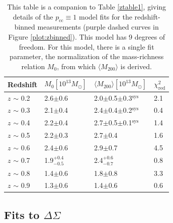 \begin{landscape}
\begin{table}
\centering
    \caption[Shear Results for Redshift-Binned Clusters (Perfectly Centered Model)]{This table is a companion to Table \ref{ztable1}, giving details of the $p_{\mathrm{cc}} \equiv 1$ model fits for the redshift-binned measurements (purple dashed curves in Figure \ref{plot:zbinned}). This model has 9 degrees of freedom. For this model, there is a single fit parameter, the normalization of the mass-richness relation $M_0$, from which $\langle M_{200} \rangle$ is derived.}
    \begin{tabular}{llll}
      \hline
      Redshift & $M_0 \left[ 10^{13} M_{\odot}\right]$ & $\langle M_{200} \rangle \left[ 10^{13} M_{\odot}\right]$ & $\chi^2_{\mathrm{red}}$ \\ \hline
      $z$ $\sim$ 0.2 & 2.6$\pm$0.6 & 2.0$\pm$0.5$\pm$0.3$^{\mathrm{sys}}$ & 2.1  \\
      $z$ $\sim$ 0.3 & 2.1$\pm$0.4 & 2.4$\pm$0.4$\pm$0.2$^{\mathrm{sys}}$ & 0.4  \\
      $z$ $\sim$ 0.4 & 2.2$\pm$0.4 & 2.7$\pm$0.5$\pm$0.1$^{\mathrm{sys}}$ & 1.4  \\
      $z$ $\sim$ 0.5 & 2.2$\pm$0.3 & 2.7$\pm$0.4 & 1.6  \\
      $z$ $\sim$ 0.6 & 2.4$\pm$0.6 & 2.9$\pm$0.7 & 4.5  \\
      $z$ $\sim$ 0.7 & 1.9$^{+0.4}_{-0.5}$ & 2.4$^{+0.6}_{-0.7}$ & 0.8  \\
      $z$ $\sim$ 0.8 & 1.4$\pm$0.6 & 1.8$\pm$0.8 & 3.3  \\ 
      $z$ $\sim$ 0.9 & 1.3$\pm$0.6 & 1.4$\pm$0.6 & 0.6  \\
      \hline
    \end{tabular}
    \label{ztable2}
\end{table}

\end{landscape}

\subsection{Fits to $\Delta\Sigma$}
\label{fits}

